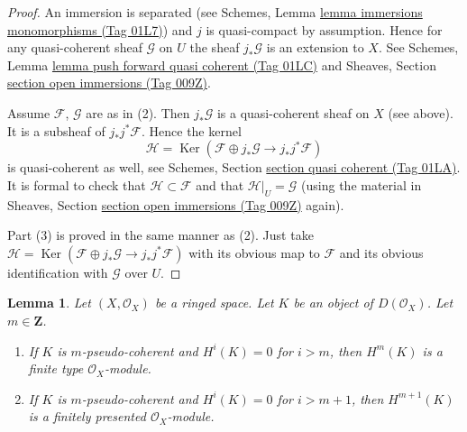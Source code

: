 \documentclass{amsart}
\theoremstyle{plain}
\newtheorem{lemma}[subsection]{Lemma}
\theoremstyle{definition}
\theoremstyle{remark}
\numberwithin{equation}{subsection}
\def\Ker{\mathop{\mathrm{Ker}}}
\begin{document}
\begin{proof}
An immersion is separated
(see Schemes, Lemma \href{https://stacks.math.columbia.edu/tag/01L7}{lemma immersions monomorphisms (Tag 01L7)})
and $j$ is quasi-compact by assumption.
Hence for any quasi-coherent sheaf $\mathcal{G}$ on $U$ the sheaf
$j_*\mathcal{G}$ is an extension to $X$. See
Schemes, Lemma \href{https://stacks.math.columbia.edu/tag/01LC}{lemma push forward quasi coherent (Tag 01LC)} and
Sheaves, Section \href{https://stacks.math.columbia.edu/tag/009Z}{section open immersions (Tag 009Z)}.

\medskip\noindent
Assume $\mathcal{F}$, $\mathcal{G}$ are as in (2).
Then $j_*\mathcal{G}$ is a quasi-coherent sheaf on $X$ (see above).
It is a subsheaf of $j_*j^*\mathcal{F}$.
Hence the kernel
$$
\mathcal{H} =
\Ker(\mathcal{F} \oplus j_* \mathcal{G}
\longrightarrow j_*j^*\mathcal{F})
$$
is quasi-coherent as well, see
Schemes, Section \href{https://stacks.math.columbia.edu/tag/01LA}{section quasi coherent (Tag 01LA)}.
It is formal to check that $\mathcal{H} \subset \mathcal{F}$ and that
$\mathcal{H}|_U = \mathcal{G}$ (using the material in
Sheaves, Section \href{https://stacks.math.columbia.edu/tag/009Z}{section open immersions (Tag 009Z)} again).

\medskip\noindent
Part (3) is proved in the same manner as (2). Just take
$\mathcal{H} = \Ker(\mathcal{F} \oplus j_* \mathcal{G}
\to j_*j^*\mathcal{F})$ with its obvious map to $\mathcal{F}$
and its obvious identification with $\mathcal{G}$ over $U$.
\end{proof}


\begin{lemma}
\label{cohomology-lemma-finite-cohomology}
Let $(X, \mathcal{O}_X)$ be a ringed space.
Let $K$ be an object of $D(\mathcal{O}_X)$.
Let $m \in \mathbf{Z}$.
\begin{enumerate}
\item If $K$ is $m$-pseudo-coherent and $H^i(K) = 0$
for $i > m$, then $H^m(K)$ is a finite type $\mathcal{O}_X$-module.
\item If $K$ is $m$-pseudo-coherent and $H^i(K) = 0$
for $i > m + 1$, then $H^{m + 1}(K)$ is a finitely presented
$\mathcal{O}_X$-module.
\end{enumerate}
\end{lemma}
\end{document}
